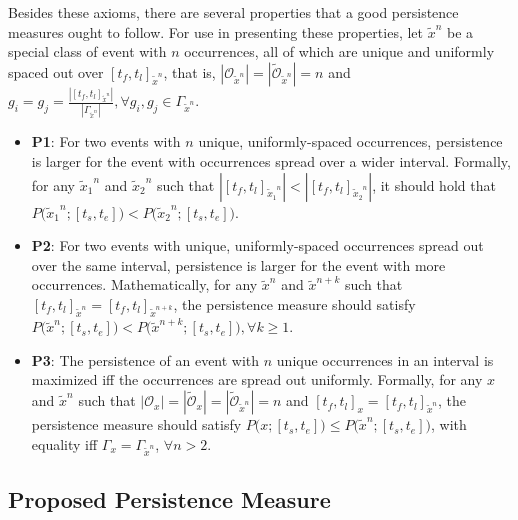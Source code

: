 \documentclass[sigconf]{acmart}
\newcommand{\x}{x}
\newcommand{\uniformx}{\tilde{\x}}
\newcommand{\intervalStart}{t_s}
\newcommand{\intervalEnd}{t_e}
\newcommand{\interval}{[\intervalStart, \intervalEnd]}
\newcommand{\occs}{\mathcal{O}}
\newcommand{\uniqueOccs}{\tilde{\occs}}
\newcommand{\firstOcc}{t_f}
\newcommand{\lastOcc}{t_l}
\newcommand{\occInterval}{[\firstOcc,\lastOcc]}
\newcommand{\persistence}{P}
\newcommand{\persistenceLong}{P\big(x;[\intervalStart,\intervalEnd]\big)}
\newcommand{\gaps}{\Gamma}
\newcommand{\gap}{g}
\newcommand{\propOne}{\textbf{P1}}
\newcommand{\propTwo}{\textbf{P2}}
\newcommand{\propThree}{\textbf{P3}}
\begin{document}
Besides these axioms, there are several properties that a good persistence measures ought to follow. For use in presenting these properties, let $\uniformx^n$ be a special class of event with $n$ occurrences, all of which are unique and uniformly spaced out over $\occInterval_{\uniformx^n}$, 
that is, $|\occs_{\uniformx^n}| = |\uniqueOccs_{\uniformx^n}| = n$ and $\gap_i = \gap_j = \frac{|\occInterval_{\uniformx^n}|}{|\gaps_{\uniformx^n}|}, \forall \gap_i,\gap_j \in \gaps_{\uniformx^n}$.

\begin{itemize}[leftmargin=*]
    \item \propOne: For two events with $n$ unique, uniformly-spaced occurrences, persistence is larger for the event with occurrences spread over a wider interval. 
    Formally, for any  ${\uniformx_1}^n$ and ${\uniformx_2}^n$ such that $|\occInterval_{{\uniformx_1}^n}| < |\occInterval_{{\uniformx_2}^n}|$, it should hold that $\persistence\big({\uniformx_1}^n;\interval\big) < \persistence\big({\uniformx_2}^n;\interval\big)$.
    \item \propTwo: For two events with unique, uniformly-spaced occurrences spread out over the same interval, persistence is larger for the event with more occurrences. 
    Mathematically, for any $\uniformx^n$ and $\uniformx^{n+k}$ such that $\occInterval_{\uniformx^n} = \occInterval_{\uniformx^{n+k}}$, the persistence measure should satisfy $\persistence\big(\uniformx^n;\interval\big) < \persistence\big(\uniformx^{n+k};\interval\big), \forall k\geq1$.
    \item \propThree: The persistence of an event with $n$ unique occurrences in an interval is maximized iff the occurrences are spread out uniformly. 
    Formally, for any $\x$ and $\uniformx^n$ such that $|\occs_\x| = |\uniqueOccs_\x| = |\uniqueOccs_{\uniformx^n}| = n$ and $\occInterval_\x = \occInterval_{\uniformx^n}$, the persistence measure should satisfy $\persistenceLong \leq \persistence\big(\uniformx^n; \interval\big)$, with equality iff $\gaps_\x = \gaps_{\uniformx^n}$, $\forall n > 2$.
\end{itemize}

\subsection{Proposed Persistence Measure}
\label{subsec:pers-measure}
\end{document}

